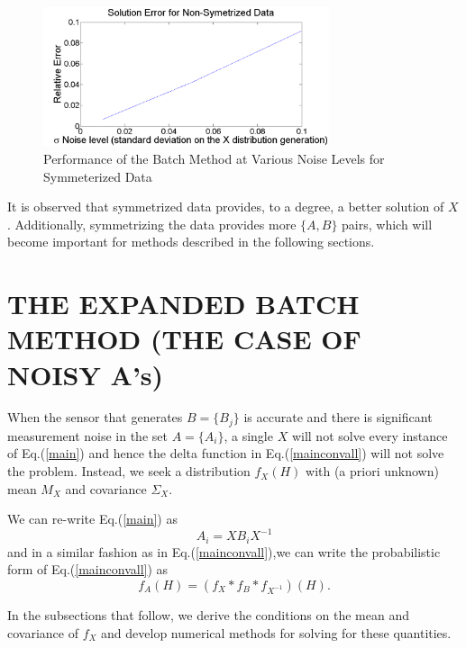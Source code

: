\documentclass[twocolumn,10pt]{asme2ej}
\begin{document}
\begin{figure}[h]
\includegraphics[width=3.3in]{figure/normerrorsym}
\centering
\caption{Performance of the Batch Method at Various Noise Levels for Symmeterized Data}
\label{normerrorsym}
\end{figure}

It is observed that symmetrized data provides, to a degree, a better solution of $X$. Additionally, symmetrizing the data provides more $\{A, B\}$ pairs, which will become important for methods described in the following sections.

\section{THE EXPANDED BATCH METHOD (THE CASE OF NOISY A's)} \label{batchnoise}

When the sensor that generates $B=\{B_j\}$ is accurate and there is significant
measurement noise in the set $A = \{A_i\}$, a single $X$ will not solve every instance of Eq.(\ref{main}) and hence the delta function in Eq.(\ref{mainconvall}) 
will not solve the problem. Instead, we seek a distribution $f_X(H)$ with (a priori unknown) mean $M_X$ and covariance $\Sigma_X$.

We can re-write Eq.(\ref{main}) as
\begin{equation} A_i = X B_i X^{-1} \label{main2} \end{equation}
and in a similar fashion as in Eq.(\ref{mainconvall}),we can write the probabilistic form of Eq.(\ref{mainconvall}) as
\begin{equation} f_A(H) = (f_X * f_B* f_{X^{-1}})(H). \label{mainconvallwnoise2} \end{equation}

In the subsections that follow, we derive the conditions on the mean and covariance of $f_X$ and
develop numerical methods for solving for these quantities.
\end{document}
